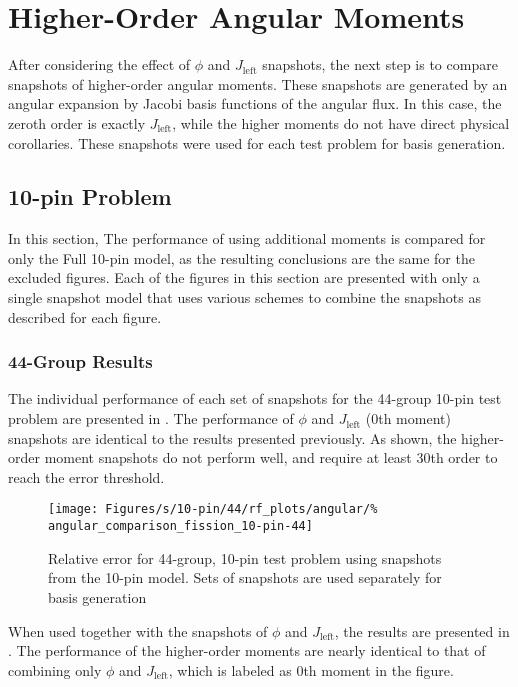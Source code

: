 \section{Higher-Order Angular Moments}

After considering the effect of $\phi$ and $J_{\text{left}}$ snapshots, 
the next step is to compare snapshots of higher-order angular moments.  These 
snapshots are generated by an angular expansion by Jacobi basis functions of 
the angular flux.  In 
this case, the zeroth order is exactly $J_{\text{left}}$, while the 
higher moments do not have direct physical corollaries.  These snapshots were 
used for each test problem for basis generation.

\subsection{10-pin Problem}

In this section,  The performance of using additional moments is compared for 
only the Full 10-pin model, as the resulting conclusions are the same for the 
excluded figures.  Each of the figures in this 
section are presented with only a single snapshot model that uses various 
schemes to combine the snapshots as described for each figure.

\subsubsection{44-Group Results}

The individual performance of each set of snapshots for the 44-group 10-pin 
test problem are presented in .  The 
performance of $\phi$ and $J_{\text{left}}$ (0th moment) snapshots are 
identical to the results presented previously.  As shown, the higher-order 
moment snapshots do not perform well, and require at least 30th order to reach 
the error threshold.

\begin{figure*}[tb]
    \centering
    \texttt{[image: Figures/s/10-pin/44/rf\_plots/angular/\%
        angular\_comparison\_fission\_10-pin-44]}
    \caption{Relative error for 44-group, 10-pin test problem using 
        snapshots from the 10-pin model.  Sets of snapshots are used 
        separately for basis generation}
    \label{fig:10-pin_10-pin-single}
\end{figure*}

When used together with the snapshots of $\phi$ and $J_{\text{left}}$, the 
results are presented in .  The 
performance of the higher-order moments are nearly identical to that of 
combining only $\phi$ and $J_{\text{left}}$, which is labeled as 0th moment in 
the figure.


